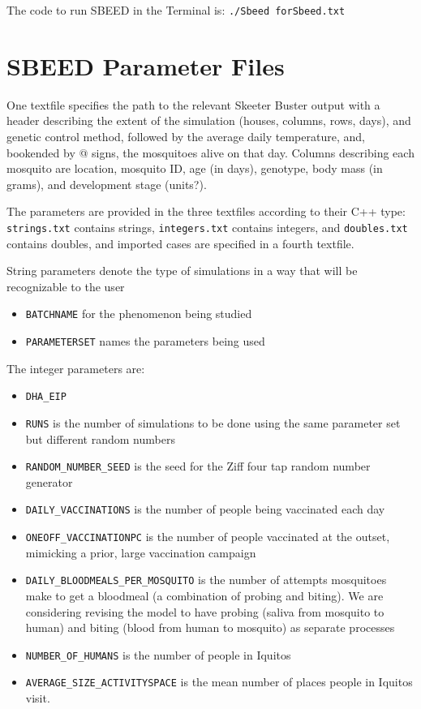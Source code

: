 \documentclass[11pt]{article}
\newcommand{\shellcmd}[1]{\newline\hspace{15pt}\texttt{#1\newline{}}}
\newcommand{\linecmd}[1]{\texttt{#1}}
\begin{document}
The code to run SBEED in the Terminal is: \shellcmd{./Sbeed forSbeed.txt}


\section{SBEED Parameter Files}

One textfile specifies the path to the relevant Skeeter Buster output with a header describing the extent of the simulation (houses, columns, rows, days), and genetic control method, followed by the average daily temperature, and, bookended by @ signs, the mosquitoes alive on that day. Columns describing each mosquito are location, mosquito ID, age (in days), genotype, body mass (in grams), and development stage (units?).

The parameters are provided in the three textfiles according to their C++ type: \linecmd{strings.txt} contains strings, \linecmd{integers.txt} contains integers, and \linecmd{doubles.txt} contains doubles, and imported cases are specified in a fourth textfile.

String parameters denote the type of simulations in a way that will be recognizable to the user
\begin{itemize}
	\item \linecmd{BATCHNAME} for the phenomenon being studied
	\item \linecmd{PARAMETERSET} names the parameters being used
\end{itemize}

The integer parameters are:
\begin{itemize}
	\item \linecmd{DHA\_EIP} %
	\item \linecmd{RUNS} is the number of simulations to be done using the same parameter set but different random numbers
	\item \linecmd{RANDOM\_NUMBER\_SEED} is the seed for the Ziff four tap random number generator
	\item \linecmd{DAILY\_VACCINATIONS} is the number of people being vaccinated each day
	\item \linecmd{ONEOFF\_VACCINATIONPC} is the number of people vaccinated at the outset, mimicking a prior, large vaccination campaign
	\item \linecmd{DAILY\_BLOODMEALS\_PER\_MOSQUITO} is the number of attempts mosquitoes make to get a bloodmeal (a combination of probing and biting). We are considering revising the model to have probing (saliva from mosquito to human) and biting (blood from human to mosquito) as separate processes
	\item \linecmd{NUMBER\_OF\_HUMANS} is the number of people in Iquitos
	\item \linecmd{AVERAGE\_SIZE\_ACTIVITYSPACE} is the mean number of places people in Iquitos visit.%
\end{itemize}
\end{document}
